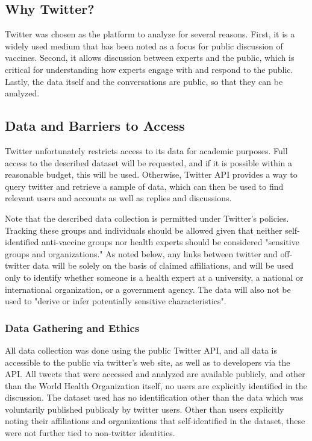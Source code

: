 \documentclass{article}
\begin{document}
\subsection{Why Twitter?}
Twitter was chosen as the platform to analyze for several reasons. First, it is a widely used medium that has been noted as a focus for public discussion of vaccines. Second, it allows discussion between experts and the public, which is critical for understanding how experts engage with and respond to the public. Lastly, the data itself and the conversations are public, so that they can be analyzed.

\subsection{Data and Barriers to Access}
Twitter unfortunately restricts access to its data for academic purposes. \cite{Alaimo2018} Full access to the described dataset will be requested, and if it is possible within a reasonable budget, this will be used. Otherwise, Twitter API provides a way to query twitter and retrieve a sample of data, which can then be used to find relevant users and accounts as well as replies and discussions. 

Note that the described data collection is permitted under Twitter's policies. Tracking these groups and individuals should be allowed given that neither self-identified anti-vaccine groups nor health experts should be considered "sensitive groups and organizations." As noted below, any links between twitter and off-twitter data will be solely on the basis of claimed affiliations, and will be used only to identify whether someone is a health expert at a university, a national or international organization, or a government agency. The data will also not be used to "derive or infer potentially sensitive characteristics".


\subsubsection{Data Gathering and Ethics}
All data collection was done using the public Twitter API, and all data is accessible to the public via twitter's web site, as well as to developers via the API. All tweets that were accessed and analyzed are available publicly, and other than the World Health Organization itself, no users are explicitly identified in the discussion. The dataset used has no identification other than the data which was voluntarily published publicaly by twitter users. Other than users explicitly noting their affiliations and organizations that self-identified in the dataset, these were not further tied to non-twitter identities.
\end{document}
